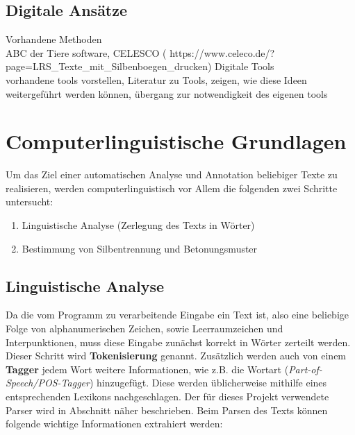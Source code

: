 \subsection{Digitale Ansätze}
Vorhandene Methoden\\
ABC der Tiere software, CELESCO ( https://www.celeco.de/?page=LRS\_Texte\_mit\_Silbenboegen\_drucken)
Digitale Tools\\

vorhandene tools vorstellen, Literatur zu Tools, zeigen, wie diese Ideen weitergeführt werden können, übergang zur notwendigkeit des eigenen tools\\

\section{Computerlinguistische Grundlagen}

Um das Ziel einer automatischen Analyse und Annotation beliebiger Texte zu realisieren, werden computerlinguistisch vor Allem die folgenden zwei Schritte untersucht:
\begin{enumerate}
	\item Linguistische Analyse (Zerlegung des Texts in Wörter)
	\item Bestimmung von Silbentrennung und Betonungsmuster
\end{enumerate}

\subsection{Linguistische Analyse}
Da die vom Programm zu verarbeitende Eingabe ein Text ist, also eine beliebige Folge von alphanumerischen Zeichen, sowie Leerraumzeichen und Interpunktionen, muss diese Eingabe zunächst korrekt in Wörter zerteilt werden. Dieser Schritt wird \textbf{Tokenisierung} genannt. Zusätzlich werden auch von einem \textbf{Tagger} jedem Wort weitere Informationen, wie z.B. die Wortart (\textit{Part-of-Speech/POS-Tagger}) hinzugefügt. Diese werden üblicherweise mithilfe eines entsprechenden Lexikons nachgeschlagen. \cite{Carstensen2009} Der für dieses Projekt verwendete Parser wird in Abschnitt  näher beschrieben. Beim Parsen des Texts können folgende wichtige Informationen extrahiert werden:

